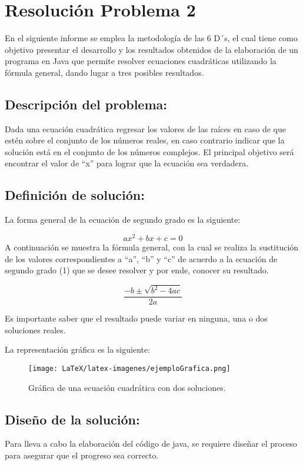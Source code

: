 \section{Resolución Problema 2} 
En el siguiente informe se emplea la metodología de las 6 D´s, el cual tiene como objetivo presentar el desarrollo y los resultados obtenidos de la elaboración de un programa en Java que permite resolver ecuaciones cuadráticas utilizando la fórmula general, dando lugar a tres posibles resultados.
\subsection{\textbf{Descripción del problema:}}
Dada una ecuación cuadrática regresar los valores de las raíces en caso de que estén sobre el conjunto de los números reales, en caso contrario indicar que la solución está en el conjunto de los números complejos. El principal objetivo será encontrar el valor de “x” para lograr que la ecuación sea verdadera.
\subsection{\textbf{Definición de solución:}}
La forma general de la ecuación de segundo grado es la siguiente:

\begin{equation}
    ax^{2}+bx+c=0  
    \label{eqn:ecuacioncuadratica}
\end{equation}
A continuación se muestra la fórmula general, con la cual se realiza la sustitución de los valores correspondientes a “a”, “b” y “c” de acuerdo a la ecuación de segundo grado (1) que se desee resolver y por ende, conocer su resultado.

\begin{equation}
    \frac{-b\pm\sqrt{b^2-4ac}}{2a}
\end{equation}

Es importante saber que el resultado puede variar en ninguna, una o dos soluciones reales.

La representación gráfica es la siguiente:

\begin{figure}[!ht]
\centering
\texttt{[image: LaTeX/latex-imagenes/ejemploGrafica.png]}
\caption{Gráfica de una ecuación cuadrática con dos soluciones.}
\label{fig:grafica}
\end{figure}

\newline
\subsection{\textbf{Diseño de la solución:}}
Para lleva a cabo la elaboración del código de java, se requiere diseñar el proceso para asegurar que el progreso sea correcto.

